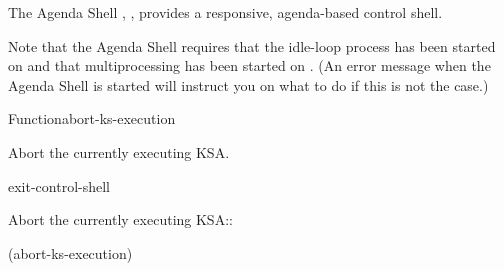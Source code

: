 \documentclass[10pt,twoside,english,pdftex]{article}
\begin{document}
%
%
%
The Agenda Shell , , provides a responsive,
agenda-based control shell.

Note that the Agenda Shell requires that the idle-loop process has been
started on  and that
multiprocessing has been started on
.  (An error message when the
Agenda Shell is started will instruct you on what to do if this is not the
case.)

\W\entities
\T\clearpage
\T\renewcommand{\headrulewidth}{0.01pt}


\begin{functiondoc}{Function}{abort-ks-execution}{\noargs}
%

\fnsyntax

\fnpurpose Abort the currently executing KSA.

\fnpackage {}

\fnmodule {}

\begin{alsos}{exit-control-shell}
\end{alsos}

\fnexample
Abort the currently executing KSA::
%
\W\supp
\begin{example}
  (abort-ks-execution)
\end{example}

\end{functiondoc}

\end{document}
